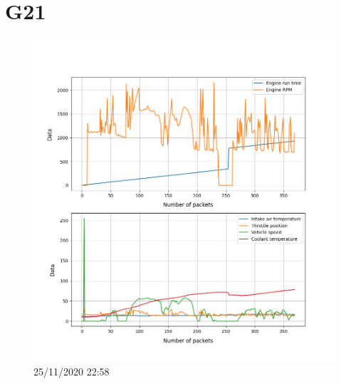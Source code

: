 \documentclass[hidelinks, 12pt, a4paper]{article}
\begin{document}
\section{G21}

\begin{figure}[h!]
\centering
	\includegraphics[height=.5\textheight, width=\textwidth]{assets/session1/g21.png}
    \caption{25/11/2020 22:58}
\end{figure}
\end{document}
